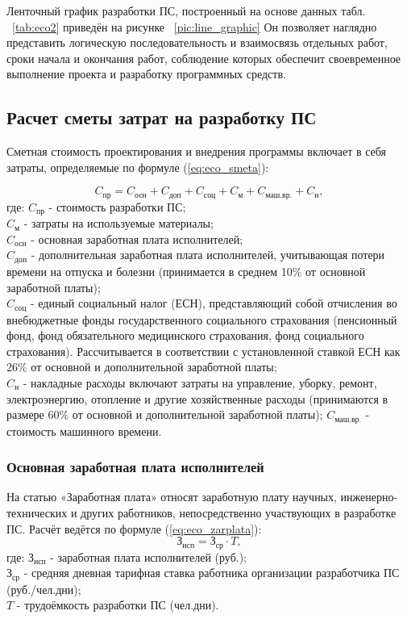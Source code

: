 Ленточный график разработки ПС, построенный на основе данных табл. ~\ref{tab:eco2} приведён на рисунке ~\ref{pic:line_graphic} 
Он позволяет наглядно представить логическую последовательность и взаимосвязь отдельных работ, сроки начала и окончания работ,
соблюдение которых обеспечит своевременное выполнение проекта и разработку программных средств.


\subsection{Расчет сметы затрат на  разработку ПС}
Сметная стоимость проектирования и внедрения программы включает в себя  затраты, определяемые по формуле (\ref{eq:eco_smeta}):

\begin{equation}
C_{\mbox{пр}} = C_{\mbox{осн}} + C_{\mbox{доп}} + C_{\mbox{соц}} + C_{\mbox{м}} + C_{\mbox{маш.вр.}} + C_{\mbox{н}},
\label{eq:eco_smeta}
\end{equation}
где:	${C_{\mbox{пр}}}$ - стоимость разработки ПС; \\
	${C_{\mbox{м}}}$ - затраты на используемые материалы; \\
	${C_{\mbox{осн}}}$ - основная заработная плата исполнителей; \\
	${C_{\mbox{доп}}}$ - дополнительная заработная плата исполнителей, учитывающая потери времени на отпуска и болезни
		(принимается в среднем 10\% от основной заработной платы); \\
	${C_{\mbox{соц}}}$ - единый социальный налог (ЕСН), представляющий собой отчисления во внебюджетные фонды
		государственного социального страхования (пенсионный фонд, фонд обязательного медицинского страхования,
		фонд социального страхования). Рассчитывается в соответствии с установленной ставкой ЕСН как 26\% от
		основной и дополнительной заработной платы; \\
	${C_{\mbox{н}}}$ - накладные расходы включают затраты на управление, уборку, ремонт, электроэнергию, отопление и
		другие хозяйственные расходы (принимаются в размере 60\% от основной и дополнительной заработной платы);
	${C_{\mbox{маш.вр.}}}$ - стоимость машинного времени. \\

\subsubsection*{Основная заработная плата исполнителей}
На статью «Заработная плата» относят заработную плату научных, инженерно-технических и других работников,
непосредственно участвующих в разработке ПС. Расчёт ведётся по формуле (\ref{eq:eco_zarplata}):
\begin{equation}
\mbox{З}_{\mbox{исп}} = \mbox{З}_{\mbox{ср}} \cdot{T},
\label{eq:eco_zarplata}
\end{equation}
где:	${\mbox{З}_{\mbox{исп}}}$ - заработная плата исполнителей (руб.); \\
	${\mbox{З}_{\mbox{ср}}}$ -  средняя дневная тарифная ставка работника организации разработчика ПС (руб./чел.дни); \\
	${T}$ - трудоёмкость разработки ПС (чел.дни). \\

